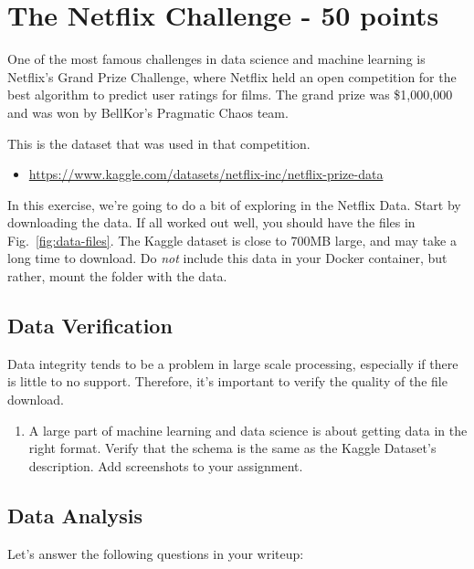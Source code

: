 \documentclass[paper=a4, fontsize=11pt]{scrartcl} %
\begin{document}
\section{The Netflix Challenge - 50 points}

One of the most famous challenges in data science and machine learning is Netflix's Grand Prize Challenge, where Netflix held an open competition for the best algorithm to predict user ratings for films. The grand prize was \$1,000,000 and was won by BellKor's Pragmatic Chaos team. 

This is the dataset that was used in that competition.
\begin{itemize}
    \item \url{https://www.kaggle.com/datasets/netflix-inc/netflix-prize-data}
\end{itemize}

In this exercise, we're going to do a bit of exploring in the Netflix Data. Start by downloading the data. If all worked out well, you should have the files in Fig.~\ref{fig:data-files}. The Kaggle dataset is close to 700MB large, and may take a long time to download. Do \emph{not} include this data in your Docker container, but rather, mount the folder with the data.

\subsection{Data Verification}

Data integrity tends to be a problem in large scale processing, especially if there is little to no support. Therefore, it's important to verify the quality of the file download. 

\noindent
\begin{enumerate}
\item A large part of machine learning and data science is about getting data in the right format. Verify that the schema is the same as the Kaggle Dataset's description. Add screenshots to your assignment.
\end{enumerate}


\subsection{Data Analysis}
\label{sec:data-analysis}

Let's answer the following questions in your writeup: 
\end{document}
